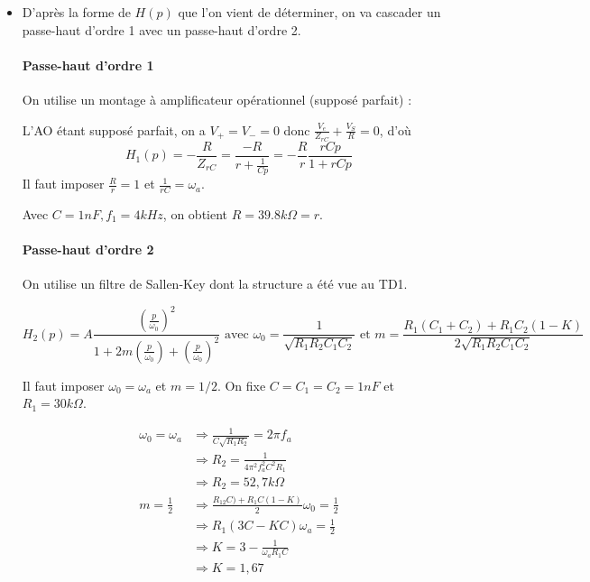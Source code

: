 \documentclass[../../Cours_M1.tex]{subfiles}
\begin{document}
\begin{itemize}
\item D'après la forme de $H(p)$ que l'on vient de déterminer, on va cascader un passe-haut d'ordre 1 avec un passe-haut d'ordre 2.

\paragraph{Passe-haut d'ordre 1} On utilise un montage à amplificateur opérationnel (supposé parfait) :
\begin{center}
\end{center}

L'AO étant supposé parfait, on a $V_+ = V_- = 0$ donc $\frac{V_e}{Z_{rC}} + \frac{V_S}{R} = 0$, d'où 
\[ H_1(p) = -\frac{R}{Z_{rC}} = \frac{-R}{r+\frac{1}{Cp}} = -\frac{R}{r} \frac{rCp}{1+rCp} \]
Il faut imposer $\frac{R}{r}=1$ et $\frac{1}{rC} = \omega_a$.

Avec $C=1nF, f_1 = 4kHz$, on obtient $R = 39.8k\Omega = r$.

\paragraph{Passe-haut d'ordre 2} On utilise un filtre de Sallen-Key dont la structure a été vue au TD1.

\[ H_2(p) = A \frac{(\frac{p}{\omega_0})^2}{1+2m(\frac{p}{\omega_0})+(\frac{p}{\omega_0})^2} \text{ avec } \omega_0 = \frac{1}{\sqrt{R_1R_2C_1C_2}} \text{ et } m = \frac{R_1(C_1+C_2) + R_1 C_2(1-K)}{2\sqrt{R_1R_2C_1C_2}} \]

Il faut imposer $\omega_0 = \omega_a$ et $m=1/2$. On fixe $ C = C_1 = C_2 = 1nF$ et $R_1 = 30k\Omega$.

\begin{align*}
\omega_0 = \omega_a & \Rightarrow \frac{1}{C\sqrt{R_1R_2}} = 2\pi f_a\\
& \Rightarrow R_2 = \frac{1}{4\pi^2f_a^2C^2R_1} \\
& \Rightarrow R_2 = 52,7 k\Omega \\
m = \frac{1}{2} & \Rightarrow  \frac{R_12C) + R_1 C(1-K)}{2}\omega_0 = \frac{1}{2} \\
& \Rightarrow R_1(3C-KC)\omega_a = \frac{1}{2} \\
& \Rightarrow K = 3 - \frac{1}{\omega_aR_1C} \\
& \Rightarrow K = 1,67 
\end{align*}


\end{itemize}
\end{document}

